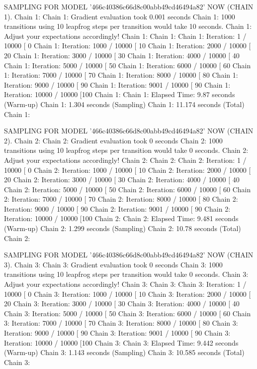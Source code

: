 \documentclass[
]{jss}
\begin{document}
\begin{CodeChunk}
\begin{CodeOutput}
SAMPLING FOR MODEL '466c40386c66d8c00abb49cd46494a82' NOW (CHAIN 1).
Chain 1: 
Chain 1: Gradient evaluation took 0.001 seconds
Chain 1: 1000 transitions using 10 leapfrog steps per transition would take 10 seconds.
Chain 1: Adjust your expectations accordingly!
Chain 1: 
Chain 1: 
Chain 1: Iteration:    1 / 10000 [  0%
Chain 1: Iteration: 1000 / 10000 [ 10%
Chain 1: Iteration: 2000 / 10000 [ 20%
Chain 1: Iteration: 3000 / 10000 [ 30%
Chain 1: Iteration: 4000 / 10000 [ 40%
Chain 1: Iteration: 5000 / 10000 [ 50%
Chain 1: Iteration: 6000 / 10000 [ 60%
Chain 1: Iteration: 7000 / 10000 [ 70%
Chain 1: Iteration: 8000 / 10000 [ 80%
Chain 1: Iteration: 9000 / 10000 [ 90%
Chain 1: Iteration: 9001 / 10000 [ 90%
Chain 1: Iteration: 10000 / 10000 [100%
Chain 1: 
Chain 1:  Elapsed Time: 9.87 seconds (Warm-up)
Chain 1:                1.304 seconds (Sampling)
Chain 1:                11.174 seconds (Total)
Chain 1: 

SAMPLING FOR MODEL '466c40386c66d8c00abb49cd46494a82' NOW (CHAIN 2).
Chain 2: 
Chain 2: Gradient evaluation took 0 seconds
Chain 2: 1000 transitions using 10 leapfrog steps per transition would take 0 seconds.
Chain 2: Adjust your expectations accordingly!
Chain 2: 
Chain 2: 
Chain 2: Iteration:    1 / 10000 [  0%
Chain 2: Iteration: 1000 / 10000 [ 10%
Chain 2: Iteration: 2000 / 10000 [ 20%
Chain 2: Iteration: 3000 / 10000 [ 30%
Chain 2: Iteration: 4000 / 10000 [ 40%
Chain 2: Iteration: 5000 / 10000 [ 50%
Chain 2: Iteration: 6000 / 10000 [ 60%
Chain 2: Iteration: 7000 / 10000 [ 70%
Chain 2: Iteration: 8000 / 10000 [ 80%
Chain 2: Iteration: 9000 / 10000 [ 90%
Chain 2: Iteration: 9001 / 10000 [ 90%
Chain 2: Iteration: 10000 / 10000 [100%
Chain 2: 
Chain 2:  Elapsed Time: 9.481 seconds (Warm-up)
Chain 2:                1.299 seconds (Sampling)
Chain 2:                10.78 seconds (Total)
Chain 2: 

SAMPLING FOR MODEL '466c40386c66d8c00abb49cd46494a82' NOW (CHAIN 3).
Chain 3: 
Chain 3: Gradient evaluation took 0 seconds
Chain 3: 1000 transitions using 10 leapfrog steps per transition would take 0 seconds.
Chain 3: Adjust your expectations accordingly!
Chain 3: 
Chain 3: 
Chain 3: Iteration:    1 / 10000 [  0%
Chain 3: Iteration: 1000 / 10000 [ 10%
Chain 3: Iteration: 2000 / 10000 [ 20%
Chain 3: Iteration: 3000 / 10000 [ 30%
Chain 3: Iteration: 4000 / 10000 [ 40%
Chain 3: Iteration: 5000 / 10000 [ 50%
Chain 3: Iteration: 6000 / 10000 [ 60%
Chain 3: Iteration: 7000 / 10000 [ 70%
Chain 3: Iteration: 8000 / 10000 [ 80%
Chain 3: Iteration: 9000 / 10000 [ 90%
Chain 3: Iteration: 9001 / 10000 [ 90%
Chain 3: Iteration: 10000 / 10000 [100%
Chain 3: 
Chain 3:  Elapsed Time: 9.442 seconds (Warm-up)
Chain 3:                1.143 seconds (Sampling)
Chain 3:                10.585 seconds (Total)
Chain 3: 


\end{CodeOutput}
\end{CodeChunk}
\end{document}
